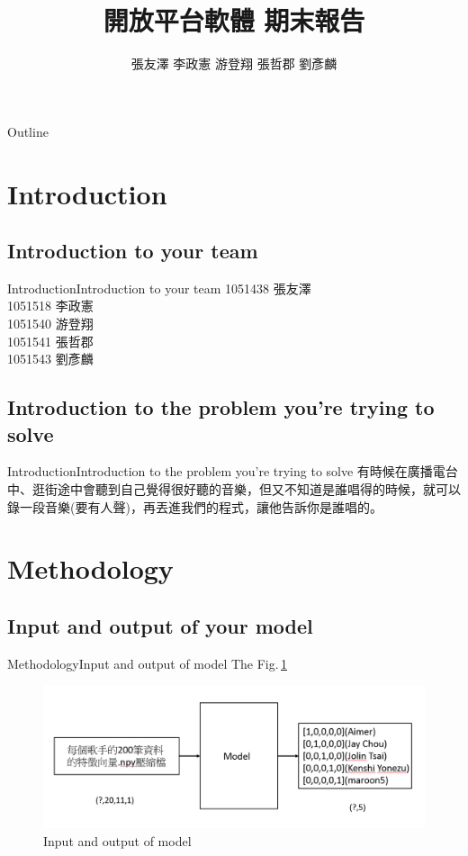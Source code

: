 \documentclass{beamer}
\begin{document}
\begin{CJK}{UTF8}{nkai}
\title{開放平台軟體 期末報告}
\author{張友澤  李政憲  游登翔  張哲郡  劉彥麟}

\begin{frame}
  \titlepage
\end{frame}

\begin{frame}{Outline}
\tiny{\tableofcontents}
\end{frame}

\section{Introduction}
\subsection{Introduction to your team}
\begin{frame}{Introduction}{Introduction to your team}
	1051438 張友澤\\
	1051518 李政憲\\ 
	1051540 游登翔\\ 
	1051541 張哲郡\\ 
	1051543 劉彥麟\\
 \end{frame}
\subsection{Introduction to the problem you're trying to solve}
\begin{frame}{Introduction}{Introduction to the problem you're trying to solve}
	有時候在廣播電台中、逛街途中會聽到自己覺得很好聽的音樂，但又不知道是誰唱得的時候，就可以錄一段音樂(要有人聲)，再丟進我們的程式，讓他告訴你是誰唱的。
 \end{frame}

\section{Methodology}
\subsection{Input and output of your model}


\end{CJK}
\end{document}
